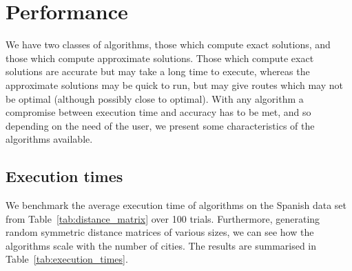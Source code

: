 \documentclass[a4paper, 11pt]{article}
\begin{document}
\section{Performance}
\label{sec:performance}

We have two classes of algorithms, those which compute exact solutions, and those which compute approximate solutions. Those which compute exact solutions are accurate but may take a long time to execute, whereas the approximate solutions may be quick to run, but may give routes which may not be optimal (although possibly close to optimal). With any algorithm a compromise between execution time and accuracy has to be met, and so  depending on the need of the user, we present some characteristics of the algorithms available.

\subsection{Execution times}
\label{subsec:execution_times}

We benchmark the average execution time of algorithms on the Spanish data set from Table~\ref{tab:distance_matrix} over 100 trials. Furthermore, generating random symmetric distance matrices of various sizes, we can see how the algorithms scale with the number of cities. The results are summarised  in Table~\ref{tab:execution_times}.
\end{document}
